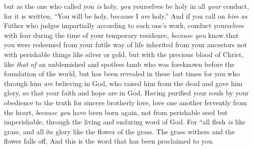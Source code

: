 \begin{biblechapter}
\verse but as the one who called you \textit{is} holy, \textit{you} yourselves be holy in all \textit{your} conduct,
\verse for it is written, “You will be holy, because I \textit{am} holy.”
\verse And if you call on \textit{him} \textit{as} Father who judges impartially according to each one’s work, conduct yourselves with fear during the time of your temporary residence,
\verse \textit{because you} know that you were redeemed from your futile way of life inherited from your ancestors not with perishable things like silver or gold,
\verse but with the precious blood of Christ, like \textit{that of} an unblemished and spotless lamb
\verse who was foreknown before the foundation of the world, but has been revealed in these last times for you
\verse who through him \textit{are} believing in God, who raised him from the dead and gave him glory, so that your faith and hope are in God.
\verse Having purified your souls by your obedience to the truth for sincere brotherly love, love one another fervently from the heart,
\verse \textit{because you} have been born again, not from perishable seed but imperishable, through the living and enduring word of God.
\verse For
\verse “all flesh \textit{is} like grass, 
and all its glory like the flower of the grass. 
The grass withers and the flower falls off, And this is the word that has been proclaimed to you.
\end{biblechapter}

